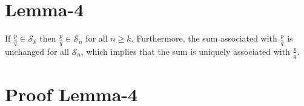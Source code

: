\documentclass{article}
\begin{document}
% 
% 
% 

\section*{Lemma-4}

If \(\frac{p}{q} \in{} \mathcal{S}_k\) then \(\frac{p}{q} \in{} \mathcal{S}_n\) for all \(n \ge{} k\).
Furthermore, the sum associated with \(\frac{p}{q}\) is unchanged for all \(\mathcal{S}_n\),
which implies that the sum is uniquely associated with \(\frac{p}{q}\).

\section*{Proof Lemma-4}
\end{document}
